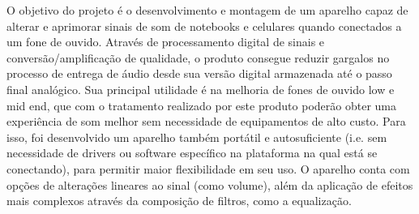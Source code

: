 
\begin{resumoutfpr}%
O objetivo do projeto é o desenvolvimento e montagem de um aparelho capaz de alterar e aprimorar sinais de som de notebooks e celulares quando conectados a um fone de ouvido. Através de processamento digital de sinais e conversão/amplificação de qualidade, o produto consegue reduzir gargalos no processo de entrega de áudio desde sua versão digital armazenada até o passo final analógico. Sua principal utilidade é na melhoria de fones de ouvido low e mid end, que com o tratamento realizado por este produto poderão obter uma experiência de som melhor sem necessidade de equipamentos de alto custo. Para isso, foi desenvolvido um aparelho também portátil e autosuficiente (i.e. sem necessidade de drivers ou software específico na plataforma na qual está se conectando), para permitir maior flexibilidade em seu uso. O aparelho conta com opções de alterações lineares ao sinal (como volume), além da aplicação de efeitos mais complexos através da composição de filtros, como a equalização.
\end{resumoutfpr}
